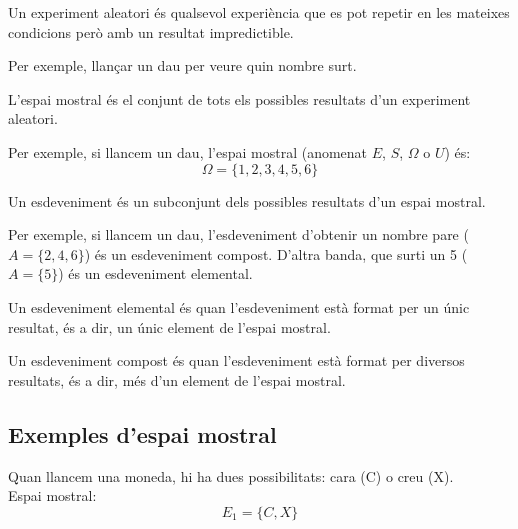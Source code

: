 \documentclass[12pt]{article}
\begin{document}
\begin{concept} [title=Experiment aleatori] \noindent Un experiment aleatori és qualsevol experiència que es pot repetir en les mateixes condicions però amb un resultat impredictible.

Per exemple, llançar un dau per veure quin nombre surt.
\end{concept}

\begin{concept} [title=Espai mostral]\noindent L'espai mostral és el conjunt de tots els possibles resultats d'un experiment aleatori.

Per exemple, si llancem un dau, l'espai mostral (anomenat $E$, $S$, $\Omega$ o $U$) és:
\[
\Omega = \{1, 2, 3, 4, 5, 6\}
\]
\end{concept}

\begin{concept} [title=Esdeveniment] \noindent Un esdeveniment és un subconjunt dels possibles resultats d'un espai mostral.

Per exemple, si llancem un dau, l'esdeveniment d'obtenir un nombre pare ($A = \{2, 4, 6\}$) és un esdeveniment compost. D'altra banda, que surti un 5 ($A = \{5\}$) és un esdeveniment elemental.
\end{concept}

\begin{concept} [title=Esdeveniment elemental]\noindent Un esdeveniment elemental és quan l'esdeveniment està format per un únic resultat, és a dir, un únic element de l'espai mostral.
\end{concept}

\begin{concept} [title=Esdeveniment compost]\noindent Un esdeveniment compost és quan l'esdeveniment està format per diversos resultats, és a dir, més d'un element de l'espai mostral.
\end{concept}

\subsection*{Exemples d'espai mostral}

\begin{exemple} [title=Llançament d'una moneda] \noindent Quan llancem una moneda, hi ha dues possibilitats: cara (C) o creu (X). \\

Espai mostral:
\[
E_1 = \{C, X\}
\]
\end{exemple}
\end{document}
